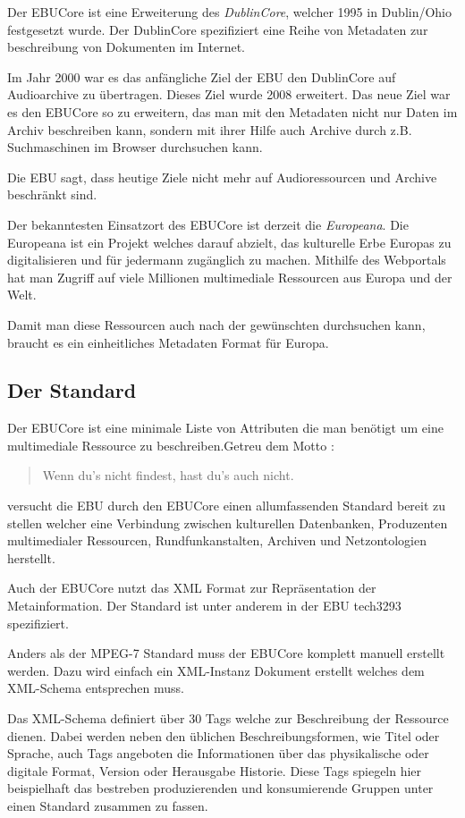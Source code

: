 	Der EBUCore ist eine Erweiterung des \emph{DublinCore}, welcher 1995 in Dublin/Ohio festgesetzt wurde. Der DublinCore spezifiziert eine Reihe von Metadaten zur beschreibung von Dokumenten im Internet.
	
	Im Jahr 2000 war es das anfängliche Ziel der EBU den DublinCore auf Audioarchive zu übertragen. Dieses Ziel wurde 2008 erweitert. Das neue Ziel war es den EBUCore so zu erweitern, das man mit den Metadaten nicht nur Daten im Archiv beschreiben kann, sondern mit ihrer Hilfe auch Archive durch z.B. Suchmaschinen im Browser durchsuchen kann.
	
	Die EBU sagt, dass heutige Ziele nicht mehr auf Audioressourcen und Archive beschränkt sind.
	
	Der bekanntesten Einsatzort des EBUCore ist derzeit die \emph{Europeana}. Die Europeana ist ein Projekt welches darauf abzielt, das kulturelle Erbe Europas zu digitalisieren und für jedermann zugänglich zu machen. Mithilfe des Webportals hat man Zugriff auf viele Millionen multimediale Ressourcen aus Europa und der Welt.
	
	Damit man diese Ressourcen auch nach der gewünschten durchsuchen kann, braucht es ein einheitliches Metadaten Format für Europa.
	
	\subsection{Der Standard}
	Der EBUCore ist eine minimale Liste von Attributen die man benötigt um eine multimediale Ressource zu beschreiben.Getreu dem Motto :\begin{quote}Wenn du's nicht findest, hast du's auch nicht.\end{quote} versucht die EBU durch den EBUCore einen allumfassenden Standard bereit zu stellen welcher eine Verbindung zwischen kulturellen Datenbanken, Produzenten multimedialer Ressourcen, Rundfunkanstalten, Archiven und Netzontologien herstellt.
	
	Auch der EBUCore nutzt das XML Format zur Repräsentation der Metainformation. Der Standard ist unter anderem in der EBU tech3293 spezifiziert.
	
	Anders als der MPEG-7 Standard muss der EBUCore komplett manuell erstellt werden. Dazu wird einfach ein XML-Instanz Dokument erstellt welches dem XML-Schema entsprechen muss.
	
	Das XML-Schema definiert über 30 Tags welche zur Beschreibung der Ressource dienen. Dabei werden neben den üblichen Beschreibungsformen, wie Titel oder Sprache, auch Tags angeboten die Informationen über das physikalische oder digitale  Format, Version oder Herausgabe Historie. Diese Tags spiegeln hier beispielhaft das bestreben produzierenden und konsumierende Gruppen unter einen Standard zusammen zu fassen.
	
